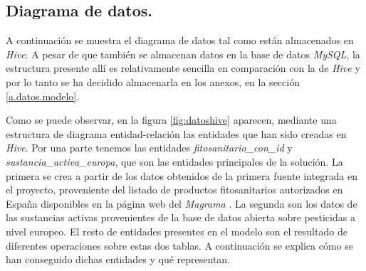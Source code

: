 \subsection{Diagrama de datos.} \label{disenyo.arquitectura.datos}
\par A continuación se muestra el diagrama de datos tal como están almacenados en \textit{Hive}. A pesar de que también se almacenan datos en la base de datos \textit{MySQL}, la estructura presente allí es relativamente sencilla en comparación con la de \textit{Hive} y por lo tanto se ha decidido almacenarla en los anexos, en la sección \ref{a.datos.modelo}. 
\par 
Como se puede observar, en la figura \ref{fig:datoshive} aparecen, mediante una estructura de diagrama entidad-relación las entidades que han sido creadas en \textit{Hive}. Por una parte tenemos las entidades \textit{fitosanitario\_con\_id} y \textit{sustancia\_activa\_europa}, que son las entidades principales de la solución. La primera se crea a partir de los datos obtenidos de la primera fuente integrada en el proyecto, proveniente del listado de productos fitosanitarios autorizados en España disponibles en la página web del \textit{Magrama} \cite{mapama}. La segunda son los datos de las sustancias activas provenientes de la base de datos abierta sobre pesticidas a nivel europeo. El resto de entidades presentes en el modelo son el resultado de diferentes operaciones sobre estas dos tablas. A continuación se explica cómo se han conseguido dichas entidades y qué representan. 
